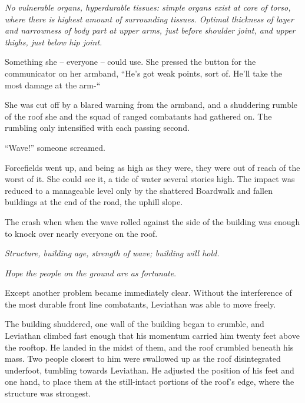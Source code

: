 {\emph{No vulnerable organs, hyperdurable tissues: simple organs exist at core of torso, where there is highest amount of surrounding tissues.  Optimal thickness of layer and narrowness of body part at upper arms, just before shoulder joint, and upper thighs, just below hip joint.}



Something she – everyone – could use.  She pressed the button for the communicator on her armband, ``He's got weak points, sort of.  He'll take the most damage at the arm-``



She was cut off by a blared warning from the armband, and a shuddering rumble of the roof she and the squad of ranged combatants had gathered on.  The rumbling only intensified with each passing second.



``Wave!'' someone screamed.



Forcefields went up, and being as high as they were, they were out of reach of the worst of it.  She could see it, a tide of water several stories high.  The impact was reduced to a manageable level  only by the shattered Boardwalk and fallen buildings at the end of the road, the uphill slope.



The crash when when the wave rolled against the side of the building was enough to knock over nearly everyone on the roof.



\emph{Structure, building age, strength of wave; building will hold.}



\emph{Hope the people on the ground are as fortunate}.



Except another problem became immediately clear.  Without the interference of the most durable front line combatants, Leviathan was able to move freely.



The building shuddered, one wall of the building began to crumble, and Leviathan climbed fast enough that his momentum carried him twenty feet above the rooftop.  He landed in the midst of them, and the roof crumbled beneath his mass.  Two people closest to him were swallowed up as the roof disintegrated underfoot, tumbling towards Leviathan.  He adjusted the position of his feet and one hand, to place them at the still-intact portions of the roof's edge, where the structure was strongest.



}

